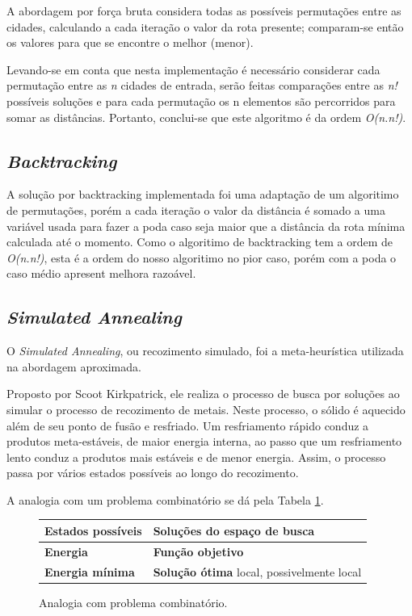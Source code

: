 \documentclass[a4paper, 12pt]{article}
\begin{document}
A abordagem por força bruta considera todas as possíveis permutações entre as cidades, calculando a cada iteração o valor da rota presente; comparam-se então os valores para que se encontre o melhor (menor).

Levando-se em conta que nesta implementação é necessário considerar cada permutação entre as \textit{n} cidades de entrada, serão feitas comparações entre as \textit{n!} possíveis soluções e para cada permutação os n elementos são percorridos para somar as distâncias. Portanto, conclui-se que este algoritmo é da ordem \textit{O(n.n!)}.

\subsection{\textit{Backtracking}}

A solução por backtracking implementada foi uma adaptação de um algoritimo de permutações, porém a cada iteração o valor da distância é somado a uma variável usada para fazer a poda caso seja maior que a distância da rota mínima calculada até o momento. Como o algoritimo de backtracking tem a ordem de \textit{O(n.n!)}, esta é a ordem do nosso algoritimo no pior caso, porém com a poda o caso médio apresent melhora razoável.

\subsection{\textit{Simulated Annealing}}

O \textit{Simulated Annealing}, ou recozimento simulado, foi a meta-heurística utilizada na abordagem aproximada.

Proposto por Scoot Kirkpatrick, ele realiza o processo de busca por soluções ao simular o processo de recozimento de metais. Neste processo, o sólido é aquecido além de seu ponto de fusão e resfriado. Um resfriamento rápido conduz a produtos meta-estáveis, de maior energia interna, ao passo que um resfriamento lento conduz a produtos mais estáveis e de menor energia. Assim, o processo passa por vários estados possíveis ao longo do recozimento.

A analogia com um problema combinatório se dá pela Tabela \ref{fig:at}.

\begin{figure}[!ht]
	\centering
    \begin{tabular}{ | l | l | }
	    \hline 
        \textbf{Estados possíveis} & \textbf{Soluções} do espaço de busca
        \\\hline
        \textbf{Energia} & \textbf{Função objetivo}
        \\\hline
        \textbf{Energia mínima} & \textbf{Solução ótima} local, possivelmente local
        \\\hline
	\end{tabular}
	\caption{Analogia com problema combinatório.}
	\label{fig:at}
\end{figure}
\end{document}
